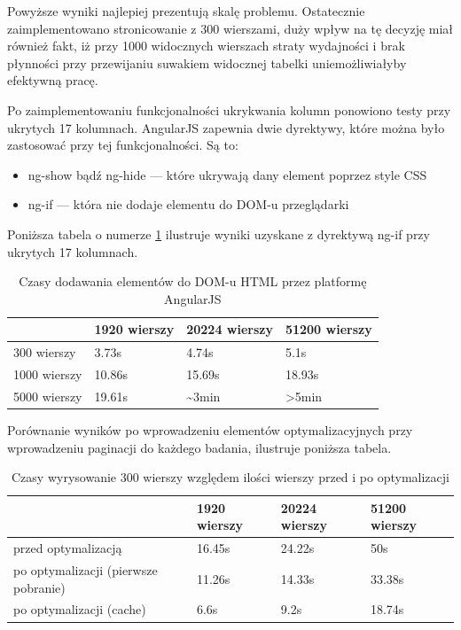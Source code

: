 \documentclass[a4paper,12pt,twoside]{article}
\begin{document}
Powyższe wyniki najlepiej prezentują skalę problemu. Ostatecznie zaimplementowano
stronicowanie z 300 wierszami, duży wpływ na tę decyzję miał również fakt, iż
przy 1000 widocznych wierszach straty wydajności i brak płynności przy przewijaniu
suwakiem widocznej tabelki uniemożliwiałyby efektywną pracę.

Po zaimplementowaniu funkcjonalności ukrykwania kolumn ponowiono testy przy ukrytych 17 kolumnach. AngularJS zapewnia dwie dyrektywy, które można było zastosować przy tej funkcjonalności. Są to:
\begin{itemize}
\item ng-show bądź ng-hide — które ukrywają dany element poprzez style CSS
\item ng-if — która nie dodaje elementu do DOM-u przeglądarki
\end{itemize}

Poniższa tabela o numerze \ref{table:tableRenderNgIf} ilustruje wyniki uzyskane z dyrektywą ng-if przy ukrytych 17 kolumnach.
\begin{table} [H]
\begin{tabular}{| p{3cm} | p{3cm} | p{3cm} | p{3cm}|}
\hline
& 1920 wierszy & 20224 wierszy & 51200 wierszy\\
\hline
300 wierszy& 3.73s& 4.74s& 5.1s\\ \hline
1000 wierszy& 10.86s & 15.69s& 18.93s\\ \hline
5000 wierszy& 19.61s& \textasciitilde 3min& >5min\\ \hline
\end{tabular}
\caption{Czasy dodawania elementów do DOM-u HTML przez platformę AngularJS}
\label{table:tableRenderNgIf}
\end{table}

Porównanie wyników po wprowadzeniu elementów optymalizacyjnych przy
wprowadzeniu paginacji do każdego badania, ilustruje poniższa
tabela.

\begin{table} [H]
\begin{tabular}{| p{3cm} | p{3cm} | p{3cm} | p{3cm}|}
\hline
& 1920 wierszy & 20224 wierszy & 51200 wierszy\\
\hline
przed optymalizacją& 16.45s& 24.22s& 50s\\ \hline
po optymalizacji (pierwsze pobranie)& 11.26s & 14.33s& 33.38s\\ \hline
po optymalizacji (cache)& 6.6s& 9.2s& 18.74s\\ \hline
\end{tabular}
\caption{Czasy wyrysowanie 300 wierszy względem ilości wierszy przed i po optymalizacji}
\label{table:summaryRender}
\end{table}
\end{document}

